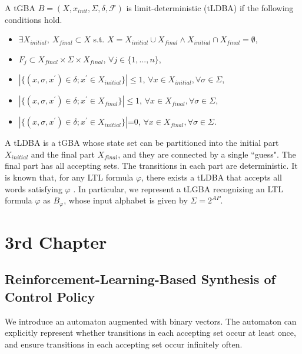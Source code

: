 \documentclass[a4j,12pt,oneside,openany,english]{jsbook}
\begin{document}
\begin{definition}
  A tGBA $B = (X, x_{init},\Sigma,\delta,\mathcal{F})$ is limit-deterministic (tLDBA) if the following conditions hold.
  \begin{itemize}
    \item $\exists X_{initial},\ X_{final} \subset X$ s.t. $X=X_{initial} \cup X_{final} \land X_{initial} \cap X_{final} = \emptyset$,
    \item $F_j \subset X_{final} \times \Sigma \times X_{final}$, $\forall j \in \{ 1,...,n \}$,
    \item $| \{ (x, \sigma, x^{\prime}) \! \in \! \delta; x^{\prime} \! \in \! X_{initial} \} | \! \leq \! 1$, $\forall x \! \in \! X_{initial}, \forall \sigma \! \in \! \Sigma$,
    \item $| \{ (x, \sigma, x^{\prime}) \in \delta; x^{\prime} \in X_{final} \} | \! \leq \! 1$, $\forall x \! \in \! X_{final}, \forall \sigma \! \in \! \Sigma$,
    \item $| \{ (x, \sigma, x^{\prime}) \in \delta; x^{\prime} \in X_{initial} \} |$=0, $\forall x \! \in \! X_{final}, \forall \sigma \! \in \! \Sigma$.
  \end{itemize}
\end{definition}
A tLDBA is a tGBA whose state set can be partitioned into the initial part $X_{initial}$ and the final part $X_{final}$, and they are connected by a single ``guess". The final part has all accepting sets. The transitions in each part are deterministic.
It is known that, for any LTL formula $ \varphi $, there exists a tLDBA that accepts all words satisfying $\varphi$ \cite{SEJK2016}.
In particular, we represent a tLGBA recognizing an LTL formula $\varphi$ as $B_{\varphi}$, whose input alphabet is given by $ \Sigma = 2^{AP} $.

\chapter{3rd Chapter}



\section{Reinforcement-Learning-Based Synthesis of Control Policy}
We introduce an automaton augmented with binary vectors. The automaton can explicitly represent whether transitions in each accepting set occur at least once, and ensure transitions in each accepting set occur infinitely often.
\end{document}
